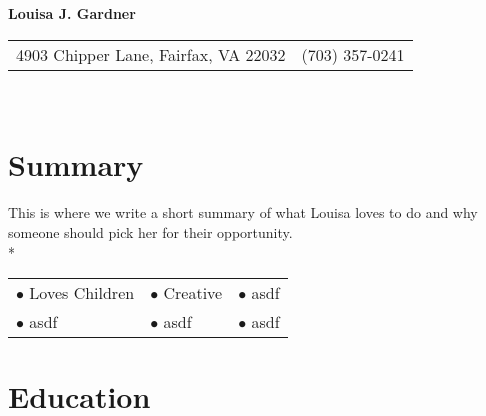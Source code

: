 \documentclass{article}
\begin{document}
\begin{center} 
\textbf{\LARGE Louisa J. Gardner} \\
\begin{tabular}{@{} l l}
	4903 Chipper Lane, Fairfax, VA 22032 	& (703) 357-0241 \\
\end{tabular} \\
\end{center}
\section{Summary}
This is where we write a short summary of what Louisa loves to do and why someone should pick her for their opportunity. \\*
\begin{minipage}{\textwidth}

\vspace{0.25cm}
\centering
\begin{tabular}{@{}p{5cm} p{5cm} p{5cm}}
	$\bullet$ Loves Children	& $\bullet$ Creative	& $\bullet$ asdf \\*
	$\bullet$ asdf 		& $\bullet$ asdf & $\bullet$ asdf \\*
\end{tabular}
\end{minipage}

\section{Education} 

\end{document}
